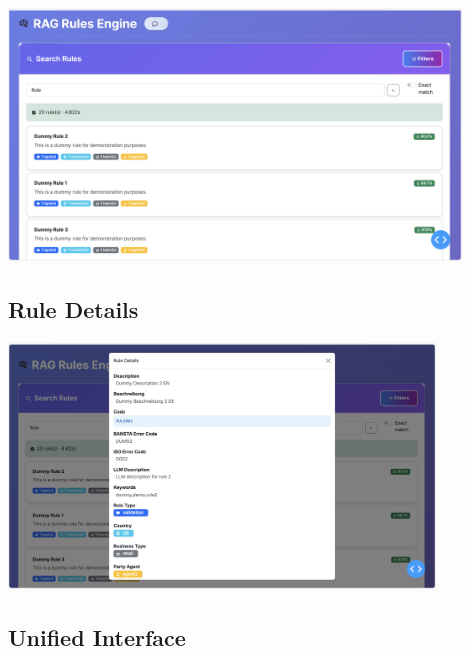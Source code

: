 \vspace{0.5em}
\noindent
\begin{minipage}{\textwidth}
\centering
\includegraphics[width=0.9\textwidth]{Figures/full_search_results.png}
\label{fig:search-results}
\end{minipage}
\vspace{0.5em}

\subsection{Rule Details}

\vspace{0.5em}
\noindent
\begin{minipage}{\textwidth}
\centering
\includegraphics[width=0.85\textwidth]{Figures/rule_details.png}
\label{fig:rule-details}
\end{minipage}
\vspace{0.5em}

\subsection{Unified Interface}

